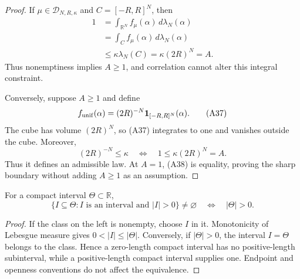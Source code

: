 \begin{proof}
If $\mu\in\mathcal D_{N,R,\kappa}$ and $C=[-R,R]^N$, then
\[
\begin{aligned}
1
&=\int_{\mathbb R^N}f_\mu(\alpha)\,d\lambda_N(\alpha)\\
&=\int_Cf_\mu(\alpha)\,d\lambda_N(\alpha)\\
&\leq\kappa\lambda_N(C)
=\kappa(2R)^N=A.
\end{aligned}
\tag{A36}
\]
Thus nonemptiness implies $A\geq1$, and correlation cannot alter this
integral constraint.

Conversely, suppose $A\geq1$ and define
\[
f_{\rm unif}(\alpha)=(2R)^{-N}\mathbf 1_{[-R,R]^N}(\alpha).
\tag{A37}
\]
The cube has volume $(2R)^N$, so \textup{(A37)} integrates to one and
vanishes outside the cube.  Moreover,
\[
(2R)^{-N}\leq\kappa
\quad\Longleftrightarrow\quad1\leq\kappa(2R)^N=A.
\tag{A38}
\]
Thus it defines an admissible law.  At $A=1$, \textup{(A38)} is equality,
proving the sharp boundary without adding $A\geq1$ as an assumption.
\end{proof}

\begin{lemma}
\label{lem:interval-class-nonempty}
For a compact interval $\Theta\subset\mathbb R$,
\[
\{I\subseteq\Theta:I\text{ is an interval and }|I|>0\}
\neq\varnothing
\quad\Longleftrightarrow\quad|\Theta|>0.
\tag{A39}
\]
\end{lemma}

\begin{proof}
If the class on the left is nonempty, choose $I$ in it.  Monotonicity of
Lebesgue measure gives $0<|I|\leq|\Theta|$.  Conversely, if
$|\Theta|>0$, the interval $I=\Theta$ belongs to the class.  Hence a
zero-length compact interval has no positive-length subinterval, while a
positive-length compact interval supplies one.  Endpoint and openness
conventions do not affect the equivalence.
\end{proof}

